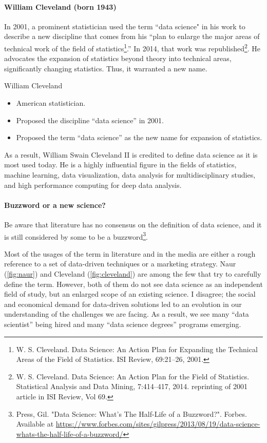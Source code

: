 \paragraph{William Cleveland (born 1943)}

In 2001, a prominent statistician used the term ``data science" in his work to describe a
new discipline that comes from his ``plan to enlarge the major areas of technical work of
the field of statistics\footnote{W. S. Cleveland. Data Science: An Action Plan for
Expanding the Technical Areas of the Field of Statistics. ISI Review, 69:21–26, 2001.}.''
In 2014, that work was republished\footnote{W. S. Cleveland.
Data Science: An Action Plan for the Field of Statistics. Statistical Analysis and Data
Mining, 7:414–417, 2014. reprinting of 2001 article in ISI Review, Vol 69.}.
He advocates the expansion of statistics beyond theory into technical areas, significantly
changing statistics.  Thus, it warranted a new name.

\begin{mainbox}{William Cleveland}
  \begin{itemize}
    \item American statistician.
    \item Proposed the discipline ``data science'' in 2001.
    \item Proposed the term ``data science'' as the new name for expansion of statistics.
  \end{itemize}
\end{mainbox}

As a result, William Swain Cleveland II is credited to define data science as it is most
used today. He is a highly influential figure in the fields of statistics, machine
learning, data visualization, data analysis for multidisciplinary studies, and high
performance computing for deep data analysis.

\paragraph{Buzzword or a new science?}

Be aware that literature has no consensus on the definition of data science, and it is still considered
by some to be a buzzword\footnote{Press, Gil. "Data Science: What's The Half-Life of a
Buzzword?". Forbes. Available at
\url{https://www.forbes.com/sites/gilpress/2013/08/19/data-science-whats-the-half-life-of-a-buzzword/}}.

Most of the usages of the term in literature and in the media are either a rough
reference to a set of data-driven techniques or a marketing strategy.  Naur
(\cref{fig:naur}) and Cleveland (\cref{fig:cleveland}) are among the few that try to
carefully define the term.  However, both of them do not see data science as an
independent field of study, but an enlarged scope of an existing science.  I disagree;
the social and economical demand for data-driven solutions led to an evolution in our
understanding of the challenges we are facing.  As a result, we see many ``data
scientist'' being hired and many ``data science degrees'' programs emerging.

